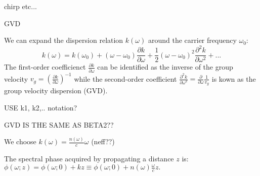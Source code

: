\documentclass[a4paper]{jpconf}
\begin{document}
chirp etc...

GVD

We can expand the dispersion relation $k(\omega)$ around the carrier frequency $\omega_0$:
\begin{equation}
k(\omega) = k(\omega_0) + (\omega - \omega_0) \frac{\partial k}{\partial \omega} + \frac{1}{2} (\omega-\omega_0)^2 \frac{\partial^2 k}{\partial \omega^2} + ...
\end{equation}
The first-order coefficienct $\frac{\partial k}{\partial \omega}$ can be identified as the inverse of the group velocity $v_g = \left( \frac{\partial k}{\partial \omega} \right)^{-1}$ while the second-order coefficient $\frac{\partial^2 k}{\partial \omega^2} = \frac{\partial}{\partial \omega} \frac{1}{v_g}$ is kown as the group velocity dispersion (GVD). 

USE k1, k2,.. notation?

GVD IS THE SAME AS BETA2??


We choose $k(\omega) = \frac{n(\omega)}{c} \omega$ (neff??)

The spectral phase acquired by propagating a distance $z$ is: $\phi(\omega; z) = \phi(\omega; 0)+ k z \equiv \phi(\omega; 0) + n(\omega) \frac{\omega}{c}z. $
\end{document}
